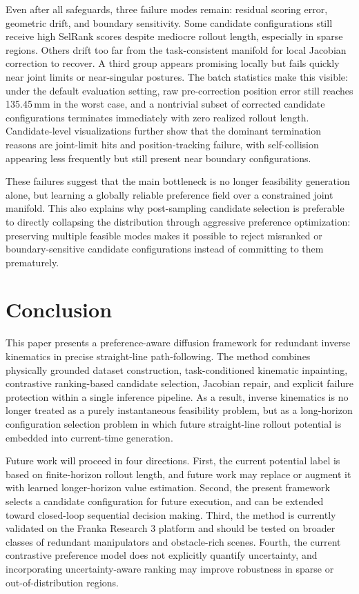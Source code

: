 \documentclass[journal, twoside]{IEEEtran}
\begin{document}
Even after all safeguards, three failure modes remain: residual scoring error, geometric drift, and boundary sensitivity. Some candidate configurations still receive high SelRank scores despite mediocre rollout length, especially in sparse regions. Others drift too far from the task-consistent manifold for local Jacobian correction to recover. A third group appears promising locally but fails quickly near joint limits or near-singular postures. The batch statistics make this visible: under the default evaluation setting, raw pre-correction position error still reaches 135.45\,mm in the worst case, and a nontrivial subset of corrected candidate configurations terminates immediately with zero realized rollout length. Candidate-level visualizations further show that the dominant termination reasons are joint-limit hits and position-tracking failure, with self-collision appearing less frequently but still present near boundary configurations.

These failures suggest that the main bottleneck is no longer feasibility generation alone, but learning a globally reliable preference field over a constrained joint manifold. This also explains why post-sampling candidate selection is preferable to directly collapsing the distribution through aggressive preference optimization: preserving multiple feasible modes makes it possible to reject misranked or boundary-sensitive candidate configurations instead of committing to them prematurely.

\section{Conclusion}
This paper presents a preference-aware diffusion framework for redundant inverse kinematics in precise straight-line path-following. The method combines physically grounded dataset construction, task-conditioned kinematic inpainting, contrastive ranking-based candidate selection, Jacobian repair, and explicit failure protection within a single inference pipeline. As a result, inverse kinematics is no longer treated as a purely instantaneous feasibility problem, but as a long-horizon configuration selection problem in which future straight-line rollout potential is embedded into current-time generation.

Future work will proceed in four directions. First, the current potential label is based on finite-horizon rollout length, and future work may replace or augment it with learned longer-horizon value estimation. Second, the present framework selects a candidate configuration for future execution, and can be extended toward closed-loop sequential decision making. Third, the method is currently validated on the Franka Research 3 platform and should be tested on broader classes of redundant manipulators and obstacle-rich scenes. Fourth, the current contrastive preference model does not explicitly quantify uncertainty, and incorporating uncertainty-aware ranking may improve robustness in sparse or out-of-distribution regions.
\end{document}
